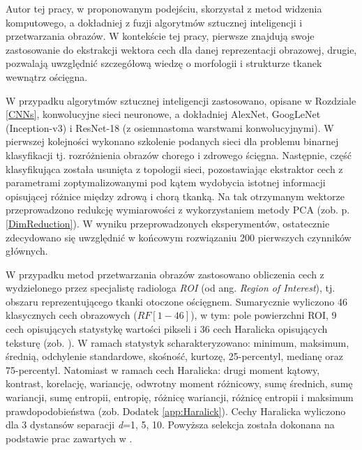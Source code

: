 Autor tej pracy, w proponowanym podejściu, skorzystał z metod widzenia komputowego, a dokładniej z fuzji algorytmów sztucznej inteligencji i przetwarzania obrazów. W kontekście tej pracy, pierwsze znajdują swoje zastosowanie do ekstrakcji wektora cech dla danej reprezentacji obrazowej, drugie, pozwalają uwzględnić szczegółową wiedzę o morfologii i strukturze tkanek wewnątrz ościęgna.

W przypadku algorytmów sztucznej inteligencji zastosowano,  opisane w Rozdziale \ref{CNNs}, konwolucyjne sieci neuronowe, a dokładniej AlexNet, GoogLeNet (Inception-v3) i ResNet-18 (z osiemnastoma warstwami konwolucyjnymi). W pierwszej kolejności wykonano szkolenie podanych sieci dla problemu binarnej klasyfikacji tj. rozróżnienia obrazów chorego i zdrowego ścięgna. Następnie, część klasyfikująca została usunięta z topologii sieci, pozostawiając ekstraktor cech z parametrami zoptymalizowanymi pod kątem wydobycia istotnej informacji opisującej różnice między zdrową i chorą tkanką. Na tak otrzymanym wektorze przeprowadzono redukcję wymiarowości z wykorzystaniem metody PCA (zob. p. \ref{DimReduction}). W wyniku przeprowadzonych eksperymentów, ostatecznie zdecydowano się uwzględnić w końcowym rozwiązaniu 200 pierwszych czynników głównych.

W przypadku metod przetwarzania obrazów zastosowano obliczenia cech z wydzielonego przez specjalistę radiologa \textit{ROI} (od ang. \textit{Region of Interest}), tj. obszaru reprezentującego tkanki otoczone ościęgnem. Sumarycznie wyliczono 46 klasycznych cech obrazowych ($RF[1-46]$), w tym: pole powierzchni ROI, 9 cech opisujących statystykę wartości pikseli i 36 cech Haralicka opisujących teksturę (zob. \cite{Haralick1973}). W ramach statystyk scharakteryzowano: minimum, maksimum, średnią, odchylenie standardowe, skośność, kurtozę, 25-percentyl, medianę oraz 75-percentyl. Natomiast w ramach cech Haralicka: drugi moment kątowy, kontrast, korelację, wariancję, odwrotny moment różnicowy, sumę średnich, sumę wariancji, sumę entropii, entropię, różnicę wariancji, różnicę entropii i maksimum prawdopodobieństwa (zob. Dodatek \ref{app:Haralick}). Cechy Haralicka wyliczono dla 3 dystansów separacji \textit{d}=1, 5, 10. Powyższa selekcja została dokonana na podstawie prac zawartych w \cite{Nowosielski17}.  

